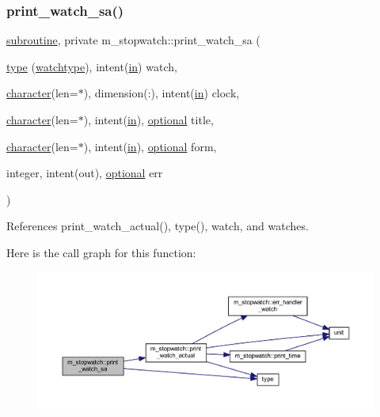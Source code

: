 \subsubsection{\texorpdfstring{print\+\_\+watch\+\_\+sa()}{print\_watch\_sa()}}
{\footnotesize\ttfamily \hyperlink{M__stopwatch_83_8txt_acfbcff50169d691ff02d4a123ed70482}{subroutine}, private m\+\_\+stopwatch\+::print\+\_\+watch\+\_\+sa (\begin{DoxyParamCaption}\item[{\hyperlink{stop__watch_83_8txt_a70f0ead91c32e25323c03265aa302c1c}{type} (\hyperlink{structm__stopwatch_1_1watchtype}{watchtype}), intent(\hyperlink{M__journal_83_8txt_afce72651d1eed785a2132bee863b2f38}{in})}]{watch,  }\item[{\hyperlink{option__stopwatch_83_8txt_abd4b21fbbd175834027b5224bfe97e66}{character}(len=$\ast$), dimension(\+:), intent(\hyperlink{M__journal_83_8txt_afce72651d1eed785a2132bee863b2f38}{in})}]{clock,  }\item[{\hyperlink{option__stopwatch_83_8txt_abd4b21fbbd175834027b5224bfe97e66}{character}(len=$\ast$), intent(\hyperlink{M__journal_83_8txt_afce72651d1eed785a2132bee863b2f38}{in}), \hyperlink{option__stopwatch_83_8txt_aa4ece75e7acf58a4843f70fe18c3ade5}{optional}}]{title,  }\item[{\hyperlink{option__stopwatch_83_8txt_abd4b21fbbd175834027b5224bfe97e66}{character}(len=$\ast$), intent(\hyperlink{M__journal_83_8txt_afce72651d1eed785a2132bee863b2f38}{in}), \hyperlink{option__stopwatch_83_8txt_aa4ece75e7acf58a4843f70fe18c3ade5}{optional}}]{form,  }\item[{integer, intent(out), \hyperlink{option__stopwatch_83_8txt_aa4ece75e7acf58a4843f70fe18c3ade5}{optional}}]{err }\end{DoxyParamCaption})\hspace{0.3cm}{\ttfamily [private]}}



References print\+\_\+watch\+\_\+actual(), type(), watch, and watches.

Here is the call graph for this function\+:
\nopagebreak
\begin{figure}[H]
\begin{center}
\leavevmode
\includegraphics[width=350pt]{namespacem__stopwatch_aa4b391b6d6f238d60db1630ff32f4a33_cgraph}
\end{center}
\end{figure}
\mbox{\label{namespacem__stopwatch_aefcb05a2035a7204aefdd3e88c5621cc}} 
